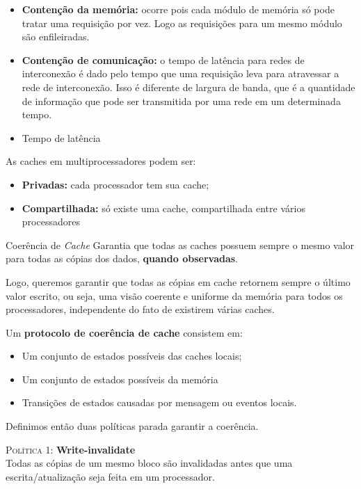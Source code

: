 \begin{itemize}
  \item \textbf{Contenção da memória:} ocorre pois cada módulo de memória só pode tratar uma requisição por vez. Logo as requisições para um mesmo módulo são enfileiradas.

  \item \textbf{Contenção de comunicação:} o tempo de latência para redes de interconexão é dado pelo tempo que uma requisição leva para atravessar a rede de interconexão. Isso é diferente de largura de banda, que é a quantidade de informação que pode ser transmitida por uma rede em um determinada tempo.

  \item Tempo de latência
\end{itemize}

As caches em multiprocessadores podem ser:
\begin{itemize}
  \item \textbf{Privadas:} cada processador tem sua cache;
  \item \textbf{Compartilhada:} só existe uma cache, compartilhada entre vários processadores
\end{itemize}

\begin{definicao}{Coerência de \textit{Cache}}
  Garantia que todas as caches possuem sempre o mesmo valor para todas as cópias dos dados, \textbf{quando observadas}.
\end{definicao}

Logo, queremos garantir que todas as cópias em cache retornem sempre o último valor escrito, ou seja, uma visão coerente e uniforme da memória para todos os processadores, independente do fato de existirem várias caches.

Um \textbf{protocolo de coerência de cache} consistem em:
\begin{itemize}
  \item Um conjunto de estados possíveis das caches locais;
  \item Um conjunto de estados possíveis da memória
  \item Transições de estados causadas por mensagem ou eventos locais.
\end{itemize}




Definimos então duas políticas parada garantir a coerência.

\textsc{Política 1:} \textbf{Write-invalidate}\\
Todas as cópias de um mesmo bloco são invalidadas antes que uma escrita/atualização seja feita em um processador.

